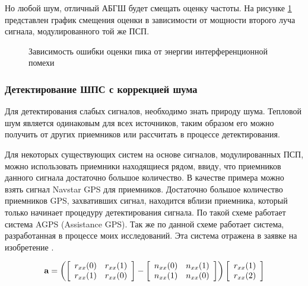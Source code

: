 Но любой шум, отличный АБГШ будет смещать оценку частоты. На рисунке \ref{pic:lpc_1sat_interference}
представлен график смещения оценки в зависимости от мощности второго луча сигнала, модулированного
той же ПСП.

\begin{figure}[H]
	\center{}
	\caption{Зависимость ошибки оценки пика от энергии интерференционной помехи}
	\label{pic:lpc_1sat_interference}
\end{figure}

\subsubsection{Детектирование ШПС с коррекцией шума}

Для детектирования слабых сигналов, необходимо знать природу шума. Тепловой шум является одинаковым для всех источников,
таким образом его можно получить от других приемников или рассчитать в процессе детектирования. 

Для некоторых существующих систем на основе сигналов, модулированных ПСП, можно использовать приемники находящиеся рядом,
ввиду, что приемников данного сигнала достаточно большое количество. В качестве примера можно взять сигнал Navstar GPS
для приемников. Достаточно большое количество приемников GPS, захвативших сигнал, находится вблизи приемника, который
только начинает процедуру детектирования сигнала. По такой схеме работает система AGPS (Assistance GPS). Так же по данной
схеме работает система, разработанная в процессе моих исследований. Эта система отражена в заявке на изобретение
\cite{patent_my}.

\begin{center}
\begin{equation}
	\label{eq:lpc_gps_1}
	{\bf a} = 
		\left(
			\left[ \begin{array}{cc}
				r_{xx}(0) & r_{xx}(1) \\
				r_{xx}(1) & r_{xx}(0)
			\end{array} \right] -
			\left[ \begin{array}{cc}
				n_{xx}(0) & n_{xx}(1) \\
				n_{xx}(1) & n_{xx}(0)
			\end{array} \right] 
		\right)
		\left[ \begin{array}{c}
			r_{xx}(1) \\
			r_{xx}(2)
		\end{array} \right]
\end{equation}
\end{center}

